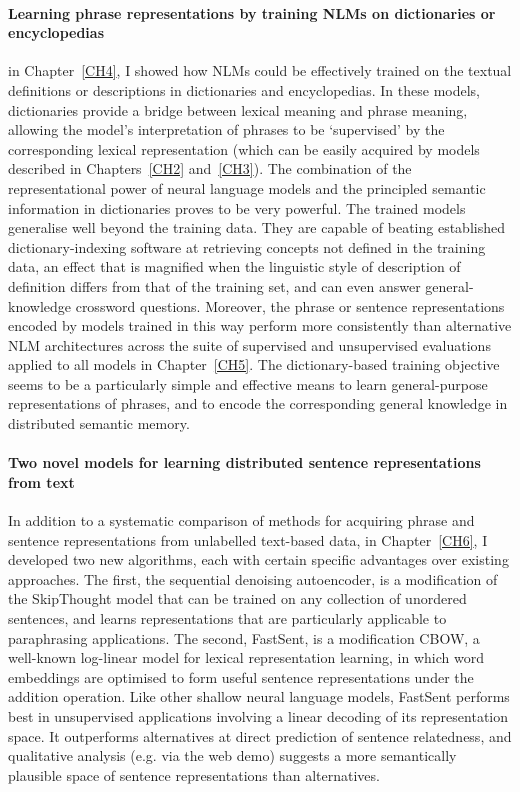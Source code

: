 \paragraph{Learning phrase representations by training NLMs on dictionaries or encyclopedias} in Chapter~\ref{CH4}, I showed how NLMs could be effectively trained on the textual definitions or descriptions in dictionaries and encyclopedias. In these models, dictionaries provide a bridge between lexical meaning and phrase meaning, allowing the model's interpretation of phrases to be `supervised' by the corresponding lexical representation (which can be  easily acquired by models described in Chapters~\ref{CH2} and~\ref{CH3}). The combination of the representational power of neural language models and the principled semantic information in dictionaries proves to be very powerful. The trained models generalise well beyond the training data. They are capable of beating established dictionary-indexing software at retrieving concepts not defined in the training data, an effect that is magnified when the linguistic style of description of definition differs from that of the training set, and can even answer general-knowledge crossword questions. Moreover, the phrase or sentence representations encoded by models trained in this way perform more consistently than alternative NLM architectures across the suite of supervised and unsupervised evaluations applied to all models in Chapter~\ref{CH5}. The dictionary-based training objective seems to be a particularly simple and effective means to learn general-purpose representations of phrases, and to encode the corresponding general knowledge in distributed semantic memory. 

\paragraph{Two novel models for learning distributed sentence representations from text} In addition to a systematic comparison of methods for acquiring phrase and sentence representations from unlabelled text-based data, in Chapter~\ref{CH6}, I developed two new algorithms, each with certain specific advantages over existing approaches. The first, the sequential denoising autoencoder, is a modification of the SkipThought model that can be trained on any collection of unordered sentences, and learns representations that are particularly applicable to paraphrasing applications. The second, FastSent, is a modification CBOW, a well-known log-linear model for lexical representation learning, in which word embeddings are optimised to form useful sentence representations under the addition operation. Like other shallow neural language models, FastSent performs best in unsupervised applications involving a linear decoding of its representation space. It outperforms alternatives at direct prediction of sentence relatedness, and qualitative analysis (e.g. via the web demo) suggests a more semantically plausible space of sentence representations than alternatives.       


